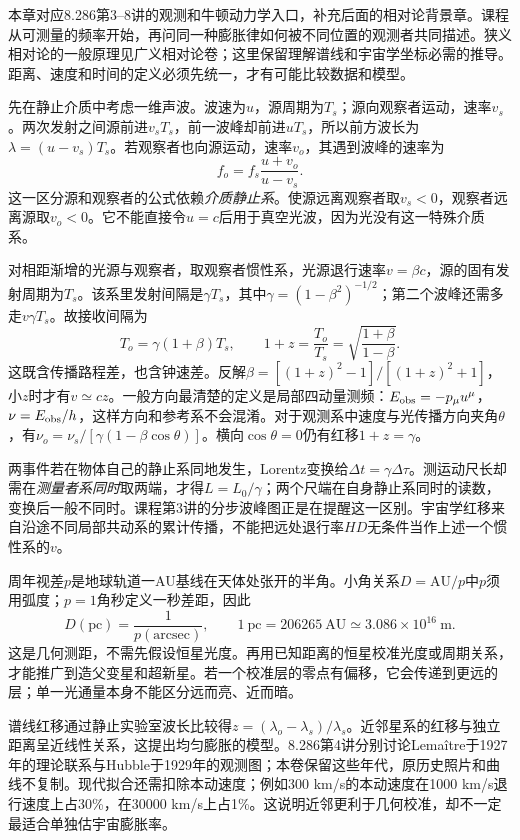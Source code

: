 本章对应8.286第3--8讲的观测和牛顿动力学入口，补充后面的相对论背景章。课程从可测量的频率开始，再问同一种膨胀律如何被不同位置的观测者共同描述。狭义相对论的一般原理见广义相对论卷；这里保留理解谱线和宇宙学坐标必需的推导。距离、速度和时间的定义必须先统一，才有可能比较数据和模型。

先在静止介质中考虑一维声波。波速为$u$，源周期为$T_s$；源向观察者运动，速率$v_s$。两次发射之间源前进$v_sT_s$，前一波峰却前进$uT_s$，所以前方波长为$\lambda=(u-v_s)T_s$。若观察者也向源运动，速率$v_o$，其遇到波峰的速率为
\[
 f_o=f_s\frac{u+v_o}{u-v_s}.
\]
这一区分源和观察者的公式依赖\emph{介质静止系}。使源远离观察者取$v_s<0$，观察者远离源取$v_o<0$。它不能直接令$u=c$后用于真空光波，因为光没有这一特殊介质系。

对相距渐增的光源与观察者，取观察者惯性系，光源退行速率$v=\beta c$，源的固有发射周期为$T_s$。该系里发射间隔是$\gamma T_s$，其中$\gamma=(1-\beta^2)^{-1/2}$；第二个波峰还需多走$v\gamma T_s$。故接收间隔为
\[
 T_o=\gamma(1+\beta)T_s,\qquad
 1+z=\frac{T_o}{T_s}=\sqrt{\frac{1+\beta}{1-\beta}}.
\]
这既含传播路程差，也含钟速差。反解$\beta=[(1+z)^2-1]/[(1+z)^2+1]$，小$z$时才有$v\simeq cz$。一般方向最清楚的定义是局部四动量测频：$E_{\rm obs}=-p_\mu u^\mu$，$\nu=E_{\rm obs}/h$，这样方向和参考系不会混淆。对于观测系中速度与光传播方向夹角$\theta$，有$\nu_o=\nu_s/[\gamma(1-\beta\cos\theta)]$。横向$\cos\theta=0$仍有红移$1+z=\gamma$。

两事件若在物体自己的静止系同地发生，Lorentz变换给$\Delta t=\gamma\Delta\tau$。测运动尺长却需在\emph{测量者系同时}取两端，才得$L=L_0/\gamma$；两个尺端在自身静止系同时的读数，变换后一般不同时。课程第3讲的分步波峰图正是在提醒这一区别。宇宙学红移来自沿途不同局部共动系的累计传播，不能把远处退行率$HD$无条件当作上述一个惯性系的$v$。

周年视差$p$是地球轨道一AU基线在天体处张开的半角。小角关系$D=\mathrm{AU}/p$中$p$须用弧度；$p=1$角秒定义一秒差距，因此
\[
 D(\mathrm{pc})=\frac1{p(\mathrm{arcsec})},\qquad
 1\ \mathrm{pc}=206265\ \mathrm{AU}\simeq3.086\times10^{16}\ \mathrm m.
\]
这是几何测距，不需先假设恒星光度。再用已知距离的恒星校准光度或周期关系，才能推广到造父变星和超新星。若一个校准层的零点有偏移，它会传递到更远的层；单一光通量本身不能区分远而亮、近而暗。

谱线红移通过静止实验室波长比较得$z=(\lambda_o-\lambda_s)/\lambda_s$。近邻星系的红移与独立距离呈近线性关系，这提出均匀膨胀的模型。8.286第4讲分别讨论Lemaître于1927年的理论联系与Hubble于1929年的观测图；本卷保留这些年代，原历史照片和曲线不复制。现代拟合还需扣除本动速度；例如300 km/s的本动速度在1000 km/s退行速度上占30\%，在30000 km/s上占1\%。这说明近邻更利于几何校准，却不一定最适合单独估宇宙膨胀率。

